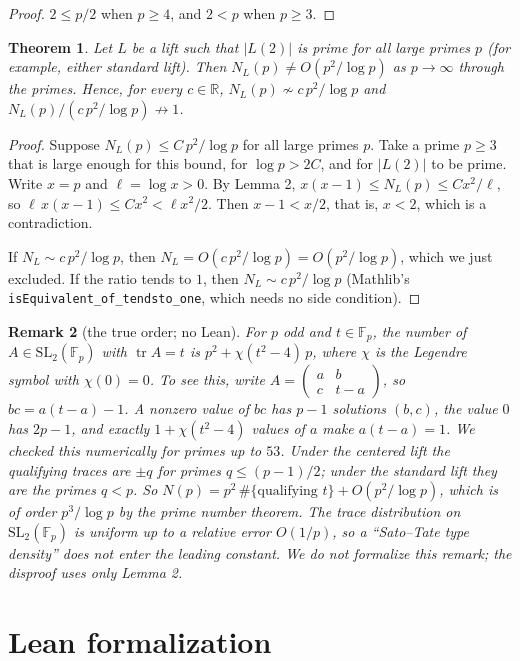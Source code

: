 \documentclass[11pt]{article}
\newtheorem{theorem}{Theorem}
\newtheorem{remark}[theorem]{Remark}
\theoremstyle{definition}
\newcommand{\tr}{\operatorname{tr}}
\newcommand{\SL}{\mathrm{SL}}
\newcommand{\F}{\mathbb{F}}
\begin{document}
\begin{proof}
$2\le p/2$ when $p\ge4$, and $2<p$ when $p\ge3$.
\end{proof}

\begin{theorem}
Let $L$ be a lift such that $|L(2)|$ is prime for all large primes $p$ (for example, either
standard lift). Then $N_L(p)\ne O(p^2/\log p)$ as $p\to\infty$ through the primes. Hence, for every
$c\in\mathbb{R}$, $N_L(p)\not\sim c\,p^2/\log p$ and $N_L(p)/(c\,p^2/\log p)\not\to1$.
\end{theorem}

\begin{proof}
Suppose $N_L(p)\le C\,p^2/\log p$ for all large primes $p$. Take a prime $p\ge3$ that is large
enough for this bound, for $\log p>2C$, and for $|L(2)|$ to be prime. Write $x=p$ and
$\ell=\log x>0$. By Lemma 2, $x(x-1)\le N_L(p)\le Cx^2/\ell$, so $\ell\,x(x-1)\le Cx^2<\ell x^2/2$.
Then $x-1<x/2$, that is, $x<2$, which is a contradiction.

If $N_L\sim c\,p^2/\log p$, then $N_L=O(c\,p^2/\log p)=O(p^2/\log p)$, which we just excluded. If
the ratio tends to $1$, then $N_L\sim c\,p^2/\log p$ (Mathlib's \texttt{isEquivalent\_of\_tendsto\_one},
which needs no side condition).
\end{proof}

\begin{remark}[the true order; no Lean]
For $p$ odd and $t\in\F_p$, the number of $A\in\SL_2(\F_p)$ with $\tr A=t$ is
$p^2+\chi(t^2-4)\,p$, where $\chi$ is the Legendre symbol with $\chi(0)=0$. To see this, write
$A=\begin{pmatrix} a&b\\ c&t-a\end{pmatrix}$, so $bc=a(t-a)-1$. A nonzero value of $bc$ has $p-1$
solutions $(b,c)$, the value $0$ has $2p-1$, and exactly $1+\chi(t^2-4)$ values of $a$ make
$a(t-a)=1$. We checked this numerically for primes up to $53$. Under the centered lift the
qualifying traces are $\pm q$ for primes $q\le(p-1)/2$; under the standard lift they are the primes
$q<p$. So $N(p)=p^2\,\#\{\text{qualifying } t\}+O(p^2/\log p)$, which is of order $p^3/\log p$ by
the prime number theorem. The trace distribution on $\SL_2(\F_p)$ is uniform up to a relative error
$O(1/p)$, so a ``Sato--Tate type density'' does not enter the leading constant. We do not
formalize this remark; the disproof uses only Lemma 2.
\end{remark}

\section{Lean formalization}
\end{document}
